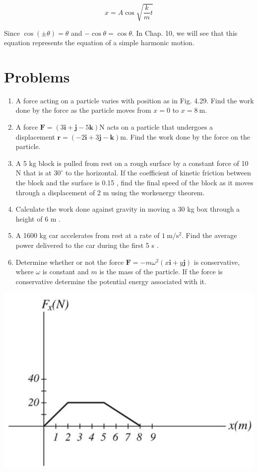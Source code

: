 \documentclass[10pt]{article}
\begin{document}
$$
x=A \cos \sqrt{\frac{k}{m} t}
$$

Since $\cos ( \pm \theta)=\theta$ and $-\cos \theta=\cos \theta$. In Chap. 10, we will see that this equation represents the equation of a simple harmonic motion.

\section*{Problems}
\begin{enumerate}
  \item A force acting on a particle varies with position as in Fig. 4.29. Find the work done by the force as the particle moves from $x=0$ to $x=8 \mathrm{~m}$.
  \item A force $\mathbf{F}=(3 \mathbf{i}+\mathbf{j}-5 \mathbf{k}) \mathrm{N}$ acts on a particle that undergoes a displacement $\mathbf{r}=(-2 \mathbf{i}+3 \mathbf{j}-\mathbf{k}) \mathrm{m}$. Find the work done by the force on the particle.
  \item A 5 kg block is pulled from rest on a rough surface by a constant force of 10 N that is at $30^{\circ}$ to the horizontal. If the coefficient of kinetic friction between the block and the surface is 0.15 , find the final speed of the block as it moves through a displacement of 2 m using the workenergy theorem.
  \item Calculate the work done against gravity in moving a 30 kg box through a height of 6 m .
  \item A 1600 kg car accelerates from rest at a rate of $1 \mathrm{~m} / \mathrm{s}^{2}$. Find the average power delivered to the car during the first 5 s .
  \item Determine whether or not the force $\mathbf{F}=-m \omega^{2}(x \mathbf{i}+y \mathbf{j})$ is conservative, where $\omega$ is constant and $m$ is the mass of the particle. If the force is conservative determine the potential energy associated with it.
\end{enumerate}

\begin{center}
\includegraphics[max width=\textwidth]{2024_09_13_db1f357d2aad0a03eb2eg-079}
\end{center}
\end{document}
